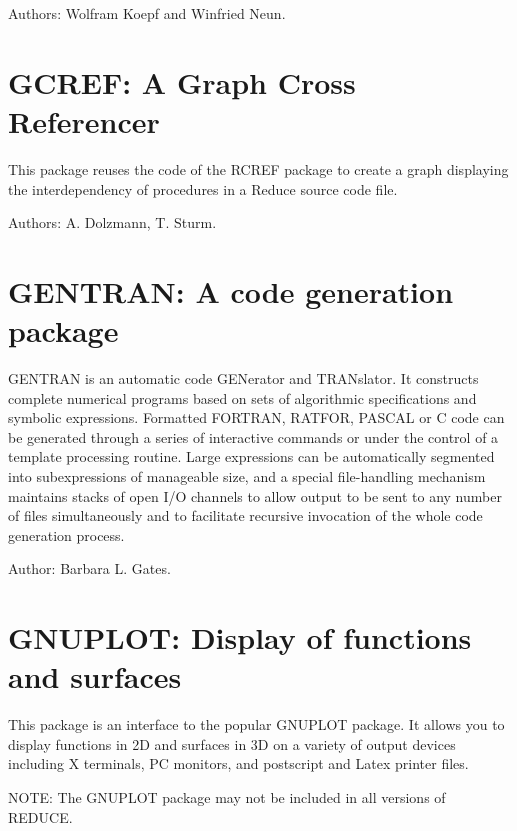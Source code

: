 Authors: Wolfram Koepf and Winfried Neun.



\newpage


\section{GCREF: A Graph Cross Referencer}
\label{GCREF}

This package reuses the code of the RCREF package to create a graph displaying
the interdependency of procedures in a Reduce source code file. 

Authors: A. Dolzmann, T. Sturm.



\newpage

\section{GENTRAN: A code generation package} 
\label{GENTRAN}

GENTRAN is an automatic code GENerator and TRANslator. It constructs
complete numerical programs based on sets of algorithmic specifications
and symbolic expressions. Formatted FORTRAN, RATFOR, PASCAL or C code can be
generated through a series of interactive commands or under the control of
a template processing routine. Large expressions can be automatically
segmented into subexpressions of manageable size, and a special
file-handling mechanism maintains stacks of open I/O channels to allow
output to be sent to any number of files simultaneously and to facilitate
recursive invocation of the whole code generation process.

Author: Barbara L. Gates.


\newpage

\section{GNUPLOT: Display of functions and surfaces}

This package is an interface to the popular GNUPLOT package.
It allows you to display functions in 2D and surfaces in 3D
on a variety of output devices including X terminals, PC monitors, and
postscript and Latex printer files.

NOTE: The GNUPLOT package may not be included in all versions of REDUCE.

